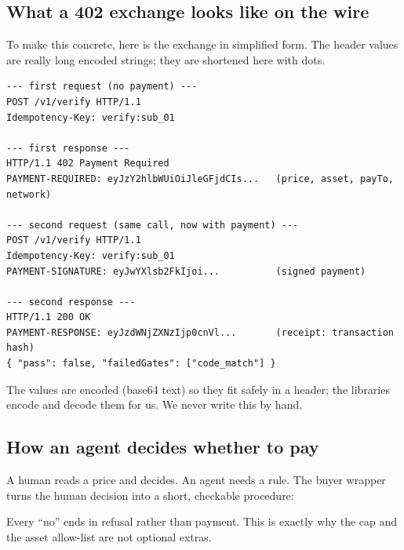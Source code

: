 \subsection{What a 402 exchange looks like on the wire}
To make this concrete, here is the exchange in simplified form. The header values are really long encoded strings; they are shortened here with dots.
\begin{lstlisting}
--- first request (no payment) ---
POST /v1/verify HTTP/1.1
Idempotency-Key: verify:sub_01

--- first response ---
HTTP/1.1 402 Payment Required
PAYMENT-REQUIRED: eyJzY2hlbWUiOiJleGFjdCIs...   (price, asset, payTo, network)

--- second request (same call, now with payment) ---
POST /v1/verify HTTP/1.1
Idempotency-Key: verify:sub_01
PAYMENT-SIGNATURE: eyJwYXlsb2FkIjoi...          (signed payment)

--- second response ---
HTTP/1.1 200 OK
PAYMENT-RESPONSE: eyJzdWNjZXNzIjp0cnVl...       (receipt: transaction hash)
{ "pass": false, "failedGates": ["code_match"] }
\end{lstlisting}
The values are encoded (base64 text) so they fit safely in a header; the libraries encode and decode them for us. We never write this by hand.

\subsection{How an agent decides whether to pay}
A human reads a price and decides. An agent needs a rule. The buyer wrapper turns the human decision into a short, checkable procedure:
\begin{center}
\end{center}
Every ``no'' ends in refusal rather than payment. This is exactly why the cap and the asset allow-list are not optional extras.

